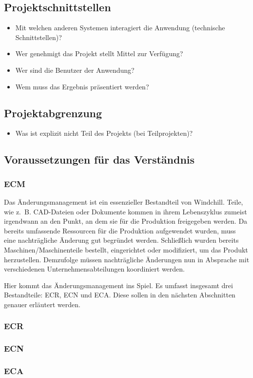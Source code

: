\subsection{Projektschnittstellen} 
\label{sec:Projektschnittstellen}
\begin{itemize}
	\item Mit welchen anderen Systemen interagiert die Anwendung (technische Schnittstellen)?
	\item Wer genehmigt das Projekt \bzw stellt Mittel zur Verfügung? 
	\item Wer sind die Benutzer der Anwendung?
	\item Wem muss das Ergebnis präsentiert werden?
\end{itemize}


\subsection{Projektabgrenzung} 
\label{sec:Projektabgrenzung}
\begin{itemize}
	\item Was ist explizit nicht Teil des Projekts (\insb bei Teilprojekten)?
\end{itemize}

\subsection{Voraussetzungen für das Verständnis}
\label{subsec:VerstaendnisVoraussetzungen}
\subsubsection{\acl{ECM}}
Das Änderungsmanagement ist ein essenzieller Bestandteil von Windchill.
Teile, wie z.\ B. CAD-Dateien oder Dokumente kommen in ihrem Lebenszyklus zumeist irgendwann an den Punkt, an dem sie für die Produktion freigegeben werden.
Da bereits umfassende Ressourcen für die Produktion aufgewendet wurden, muss eine nachträgliche Änderung gut begründet werden.
Schließlich wurden bereits Maschinen/Maschinenteile bestellt, eingerichtet oder modifiziert, um das Produkt herzustellen.
Demzufolge müssen nachträgliche Änderungen nun in Absprache mit verschiedenen Unternehmensabteilungen koordiniert werden.

Hier kommt das Änderungsmanagement ins Spiel.
Es umfasst insgesamt drei Bestandteile: \acl{ECR}, \acl{ECN} und \acl{ECA}.
Diese sollen in den nächsten Abschnitten genauer erläutert werden.

\subsubsection{\acl{ECR}}


\subsubsection{\acl{ECN}}


\subsubsection{\acl{ECA}}

